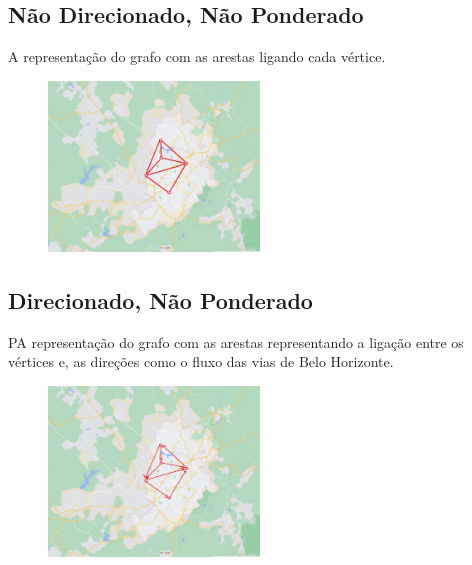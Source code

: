 \documentclass[12pt]{article}
\begin{document}
\subsection{Não Direcionado, Não Ponderado}
A representação do grafo com as arestas ligando cada vértice.
\begin{center}
    
    \begin{figure}[h!]
        \includegraphics[trim={15cm 10cm 10cm 10cm},clip, width=0.5\textwidth]{imagens/grafos4.jpeg}
    \end{figure}
\end{center}


\subsection{Direcionado, Não Ponderado}
PA representação do grafo com as arestas representando a ligação entre os vértices e, as direções como o fluxo das vias de Belo Horizonte.
\begin{center}
    
    \begin{figure}[h!]
        \includegraphics[trim={10cm 7cm 7cm 7cm},clip, width=0.5\textwidth]{imagens/grafos2.jpeg}
    \end{figure}

\end{center}
\end{document}
